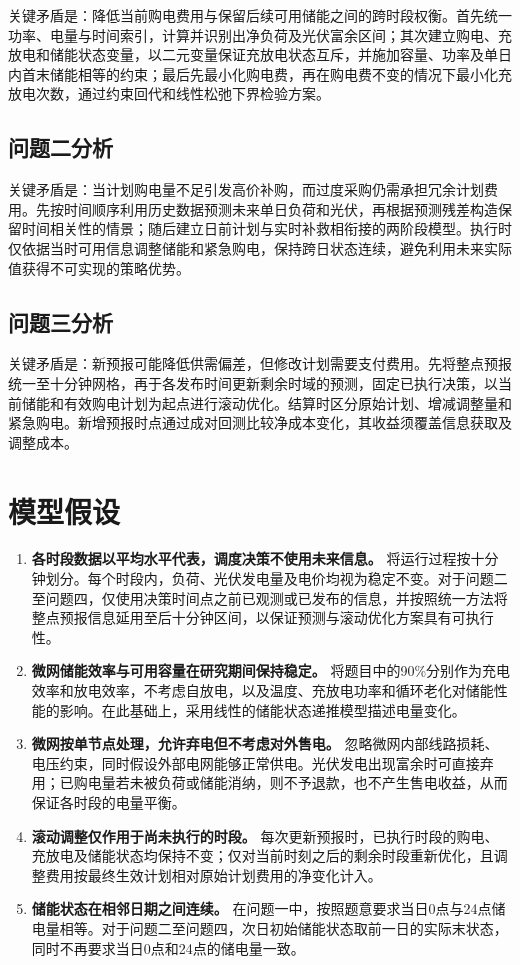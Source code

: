 \documentclass[UTF8,a4paper,12pt,fontset=fandol]{ctexart}
\numberwithin{equation}{section}
\begin{document}
关键矛盾是：降低当前购电费用与保留后续可用储能之间的跨时段权衡。首先统一功率、电量与时间索引，计算并识别出净负荷及光伏富余区间；其次建立购电、充放电和储能状态变量，以二元变量保证充放电状态互斥，并施加容量、功率及单日内首末储能相等的约束；最后先最小化购电费，再在购电费不变的情况下最小化充放电次数，通过约束回代和线性松弛下界检验方案。

\subsection{问题二分析}

关键矛盾是：当计划购电量不足引发高价补购，而过度采购仍需承担冗余计划费用。先按时间顺序利用历史数据预测未来单日负荷和光伏，再根据预测残差构造保留时间相关性的情景；随后建立日前计划与实时补救相衔接的两阶段模型。执行时仅依据当时可用信息调整储能和紧急购电，保持跨日状态连续，避免利用未来实际值获得不可实现的策略优势。

\subsection{问题三分析}

关键矛盾是：新预报可能降低供需偏差，但修改计划需要支付费用。先将整点预报统一至十分钟网格，再于各发布时间更新剩余时域的预测，固定已执行决策，以当前储能和有效购电计划为起点进行滚动优化。结算时区分原始计划、增减调整量和紧急购电。新增预报时点通过成对回测比较净成本变化，其收益须覆盖信息获取及调整成本。

\section{模型假设}
\begin{enumerate}
\item \textbf{各时段数据以平均水平代表，调度决策不使用未来信息。}
将运行过程按十分钟划分。每个时段内，负荷、光伏发电量及电价均视为稳定不变。对于问题二至问题四，仅使用决策时间点之前已观测或已发布的信息，并按照统一方法将整点预报信息延用至后十分钟区间，以保证预测与滚动优化方案具有可执行性。

\item \textbf{微网储能效率与可用容量在研究期间保持稳定。}
将题目中的90\%分别作为充电效率和放电效率，不考虑自放电，以及温度、充放电功率和循环老化对储能性能的影响。在此基础上，采用线性的储能状态递推模型描述电量变化。

\item \textbf{微网按单节点处理，允许弃电但不考虑对外售电。}
忽略微网内部线路损耗、电压约束，同时假设外部电网能够正常供电。光伏发电出现富余时可直接弃用；已购电量若未被负荷或储能消纳，则不予退款，也不产生售电收益，从而保证各时段的电量平衡。

\item \textbf{滚动调整仅作用于尚未执行的时段。}
每次更新预报时，已执行时段的购电、充放电及储能状态均保持不变；仅对当前时刻之后的剩余时段重新优化，且调整费用按最终生效计划相对原始计划费用的净变化计入。

\item \textbf{储能状态在相邻日期之间连续。}
在问题一中，按照题意要求当日0点与24点储电量相等。对于问题二至问题四，次日初始储能状态取前一日的实际末状态，同时不再要求当日0点和24点的储电量一致。
\end{enumerate}
\end{document}
